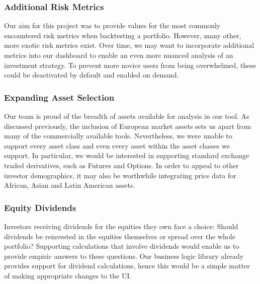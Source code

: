 \documentclass[main.tex]{subfiles}
\begin{document}
\subsubsection{Additional Risk Metrics}

Our aim for this project was to provide values for the most commonly encountered risk metrics when backtesting a portfolio. However, many other, more exotic risk metrics exist. Over time, we may want to incorporate additional metrics into our dashboard to enable an even more nuanced analysis of an investment strategy. To prevent more novice users from being overwhelmed, these could be deactivated by default and enabled on demand.

\subsubsection{Expanding Asset Selection}

Our team is proud of the breadth of assets available for analysis in our tool. As discussed previously, the inclusion of European market assets sets us apart from many of the commercially available tools. Nevertheless, we were unable to support every asset class and even every asset within the asset classes we support. In particular, we would be interested in supporting standard exchange traded derivatives, such as Futures and Options. In order to appeal to other investor demographics, it may also be worthwhile integrating price data for African, Asian and Latin American assets.

\subsubsection{Equity Dividends}

Investors receiving dividends for the equities they own face a choice: Should dividends be reinvested in the equities themselves or spread over the whole portfolio? Supporting calculations that involve dividends would enable us to provide empiric answers to these questions. Our business logic library already provides support for dividend calculations, hence this would be a simple matter of making appropriate changes to the UI.
\end{document}
